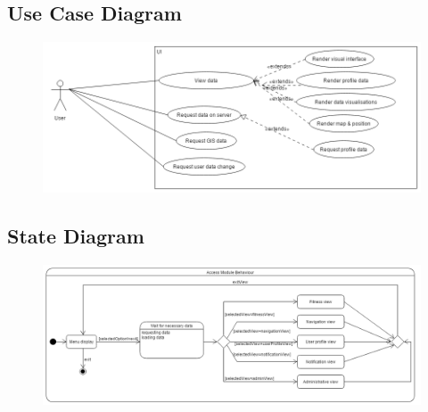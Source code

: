 \subsection{Use Case Diagram}
\begin{figure}[H]
	\includegraphics[width=\textwidth]{Access_Modules/AUCD_v2.png}
\end{figure}

\subsection{State Diagram}
\begin{figure}[H]
	\includegraphics[width=\textwidth]{Access_Modules/AccessStateDiagram.png}
\end{figure}



